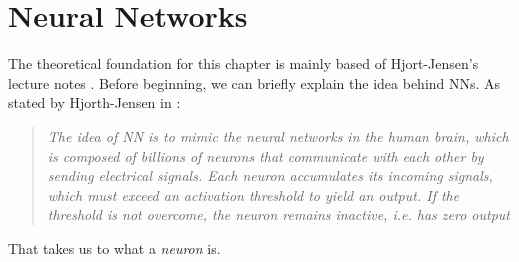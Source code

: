 \documentclass[12pt, a4paper]{book}
\begin{document}
\newpage
\section{Neural Networks}\label{sec:theory_nn}
The theoretical foundation for this chapter is mainly based of Hjort-Jensen's lecture notes \cite{MORTYY1, MORTYY2, MORTYY3}. Before beginning, we can briefly explain the idea behind NNs. As stated by Hjorth-Jensen in \cite{MORTYY1}:
\begin{quote}
    \textit{The idea of NN is to mimic the neural networks in the human brain, which is composed of billions of neurons that communicate with each other by sending electrical signals. 
    Each neuron accumulates its incoming signals, which must exceed an activation threshold to yield an output. If the threshold is not overcome, the neuron remains inactive, i.e. has zero output}
\end{quote}
That takes us to what a \textit{neuron} is.
\end{document}
